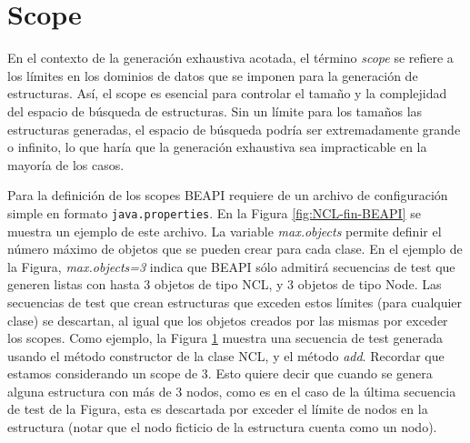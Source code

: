 
\section{Scope}
\label{sec:scope}

En el contexto de la generación exhaustiva acotada, el término \emph{scope} se
refiere a los límites en los dominios de datos que se imponen para la generación de
estructuras. 
Así, el scope es esencial para controlar el tamaño y la complejidad del espacio de búsqueda de estructuras. 
Sin un límite para los tamaños las estructuras generadas,
 el espacio de búsqueda podría ser extremadamente grande o infinito, lo que haría
 que la generación exhaustiva sea impracticable en la mayoría de los casos. 

Para la definición de los scopes BEAPI requiere de un archivo de configuración
simple en formato \texttt{java.properties}. En la Figura \ref{fig:NCL-fin-BEAPI}
se muestra un ejemplo de este archivo. 
La variable \emph{max.objects} permite definir el número
máximo de objetos que se pueden crear para cada clase. En el ejemplo de la
Figura, \emph{max.objects=3} indica que BEAPI sólo admitirá secuencias de test que
generen listas con hasta 3 objetos de tipo NCL, y 3 objetos de tipo Node. Las
secuencias de test que crean estructuras que 
exceden estos límites (para cualquier clase) se descartan, al igual que los
objetos creados por las mismas por exceder los scopes. Como ejemplo, la Figura
\ref{sec:scope} muestra una secuencia de test generada usando el método constructor
de la clase NCL, y el método \emph{add}. Recordar que estamos considerando un scope de 3. 
Esto quiere decir que cuando se genera alguna estructura con más de 3 nodos, como es en 
el caso de la última secuencia de test de la Figura, esta es descartada por exceder el 
límite de nodos en la estructura (notar que el nodo ficticio de la estructura cuenta como un
nodo). 


